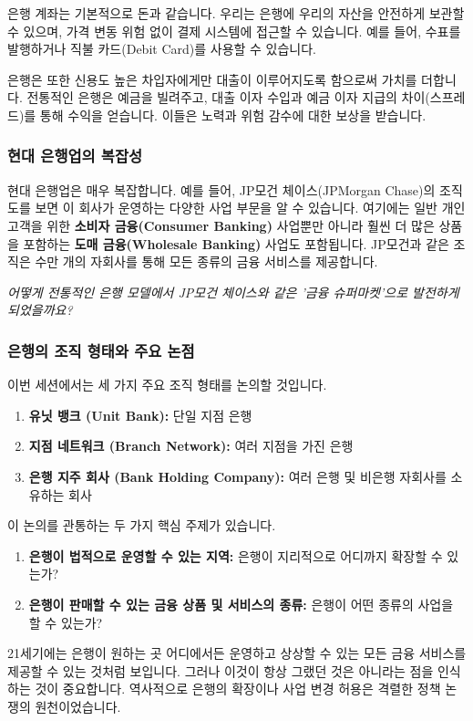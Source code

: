 \documentclass[11pt,a4paper]{book}
\theoremstyle{definition}
\begin{document}
\begin{examplebox}[title={은행 계좌의 가치}]
은행 계좌는 기본적으로 돈과 같습니다. 우리는 은행에 우리의 자산을 안전하게 보관할 수 있으며, 가격 변동 위험 없이 결제 시스템에 접근할 수 있습니다. 예를 들어, 수표를 발행하거나 직불 카드(Debit Card)를 사용할 수 있습니다.
\end{examplebox}

은행은 또한 신용도 높은 차입자에게만 대출이 이루어지도록 함으로써 가치를 더합니다. 전통적인 은행은 예금을 빌려주고, 대출 이자 수입과 예금 이자 지급의 차이(스프레드)를 통해 수익을 얻습니다. 이들은 노력과 위험 감수에 대한 보상을 받습니다.

\subsubsection*{현대 은행업의 복잡성}
현대 은행업은 매우 복잡합니다. 예를 들어, JP모건 체이스(JPMorgan Chase)의 조직도를 보면 이 회사가 운영하는 다양한 사업 부문을 알 수 있습니다. 여기에는 일반 개인 고객을 위한 \textbf{소비자 금융(Consumer Banking)} 사업뿐만 아니라 훨씬 더 많은 상품을 포함하는 \textbf{도매 금융(Wholesale Banking)} 사업도 포함됩니다. JP모건과 같은 조직은 수만 개의 자회사를 통해 모든 종류의 금융 서비스를 제공합니다.

\begin{center}
    \textit{어떻게 전통적인 은행 모델에서 JP모건 체이스와 같은 '금융 슈퍼마켓'으로 발전하게 되었을까요?}
\end{center}

\subsubsection*{은행의 조직 형태와 주요 논점}
이번 세션에서는 세 가지 주요 조직 형태를 논의할 것입니다.
\begin{enumerate}
    \item \textbf{유닛 뱅크 (Unit Bank):} 단일 지점 은행
    \item \textbf{지점 네트워크 (Branch Network):} 여러 지점을 가진 은행
    \item \textbf{은행 지주 회사 (Bank Holding Company):} 여러 은행 및 비은행 자회사를 소유하는 회사
\end{enumerate}
이 논의를 관통하는 두 가지 핵심 주제가 있습니다.
\begin{enumerate}
    \item \textbf{은행이 법적으로 운영할 수 있는 지역:} 은행이 지리적으로 어디까지 확장할 수 있는가?
    \item \textbf{은행이 판매할 수 있는 금융 상품 및 서비스의 종류:} 은행이 어떤 종류의 사업을 할 수 있는가?
\end{enumerate}
21세기에는 은행이 원하는 곳 어디에서든 운영하고 상상할 수 있는 모든 금융 서비스를 제공할 수 있는 것처럼 보입니다. 그러나 이것이 항상 그랬던 것은 아니라는 점을 인식하는 것이 중요합니다. 역사적으로 은행의 확장이나 사업 변경 허용은 격렬한 정책 논쟁의 원천이었습니다.
\end{document}
